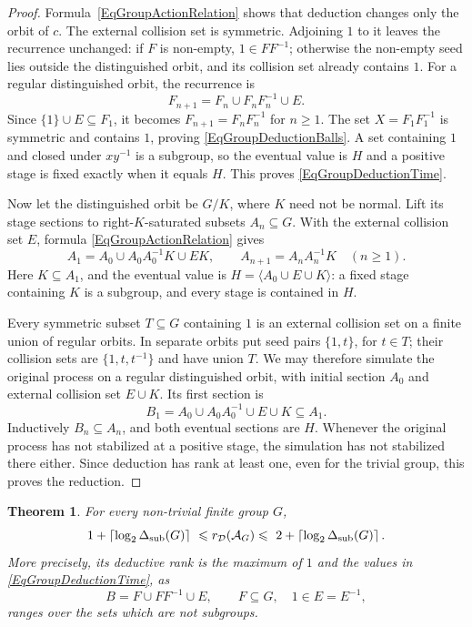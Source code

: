 \documentclass[12pt,english]{amsart}
\newtheorem{theorem}{Theorem}[section]
\theoremstyle{definition}
\numberwithin{equation}{section}
\theoremstyle{remark}
\begin{document}
\begin{proof}
Formula~\eqref{EqGroupActionRelation} shows that deduction changes
only the orbit of $c$. The external collision set is symmetric.
Adjoining $1$ to it leaves the recurrence unchanged: if $F$ is
non-empty, $1\in FF^{-1}$; otherwise the non-empty seed lies outside
the distinguished orbit, and its collision set already contains $1$.
For a regular distinguished orbit, the recurrence is
\[
F_{n+1}=F_n\cup F_nF_n^{-1}\cup E.
\]
Since $\{1\}\cup E\subseteq F_1$, it becomes
$F_{n+1}=F_nF_n^{-1}$ for $n\geqslant1$. The set
$X=F_1F_1^{-1}$ is symmetric and contains $1$, proving
\eqref{EqGroupDeductionBalls}. A set containing $1$ and closed under
$xy^{-1}$ is a subgroup, so the eventual value is $H$ and a
positive stage is fixed exactly when it equals $H$. This proves
\eqref{EqGroupDeductionTime}.

Now let the distinguished orbit be $G/K$, where $K$ need not be
normal. Lift its stage sections to right-$K$-saturated subsets
$A_n\subseteq G$. With the external collision set $E$, formula
\eqref{EqGroupActionRelation} gives
\[
A_1=A_0\cup A_0A_0^{-1}K\cup EK,\qquad
A_{n+1}=A_nA_n^{-1}K\quad(n\geqslant1).
\]
Here $K\subseteq A_1$, and the eventual value is
$H=\langle A_0\cup E\cup K\rangle$: a fixed stage containing
$K$ is a subgroup, and every stage is contained in $H$.

Every symmetric subset $T\subseteq G$ containing $1$ is an external
collision set on a finite union of regular orbits. In separate
orbits put seed pairs $\{1,t\}$, for $t\in T$; their collision
sets are $\{1,t,t^{-1}\}$ and have union $T$. We may therefore
simulate the original process on a regular distinguished orbit,
with initial section $A_0$ and external collision set $E\cup K$.
Its first section is
\[
B_1=A_0\cup A_0A_0^{-1}\cup E\cup K\subseteq A_1.
\]
Inductively $B_n\subseteq A_n$, and both eventual sections are
$H$. Whenever the original process has not stabilized at a
positive stage, the simulation has not stabilized there either.
Since deduction has rank at least one, even for the trivial group,
this proves the reduction.
\end{proof}

\begin{theorem}\label{ThmGroupDeductiveDiameter}
For every non-trivial finite group $G$,
\[
1+\left\lceil\log_2\Delta_{\rm sub}(G)\right\rceil
\ \leqslant r_{\mathcal D}(\mathcal A_G)\leqslant\
2+\left\lceil\log_2\Delta_{\rm sub}(G)\right\rceil.
\]
More precisely, its deductive rank is the maximum of $1$ and the
values in \eqref{EqGroupDeductionTime}, as
\[
B=F\cup FF^{-1}\cup E,\qquad
F\subseteq G,\quad 1\in E=E^{-1},
\]
ranges over the sets which are not subgroups.
\end{theorem}
\end{document}
